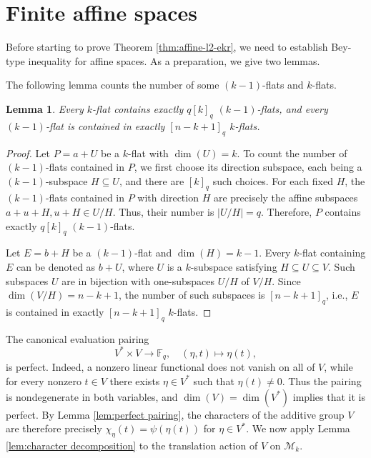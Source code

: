 \documentclass[11pt]{article}
\newtheorem{lemma}{Lemma}
\theoremstyle{definition}
\newcommand{\Fq}{\mathbb F_q}
\begin{document}
\section{Finite affine spaces}


Before starting to prove Theorem \ref{thm:affine-l2-ekr}, we  need to establish Bey-type inequality for affine spaces. As a preparation, we give two lemmas.

The following lemma  counts the number of some $(k-1)$-flats and $k$-flats.

\begin{lemma}\label{lem:affine-counts}
Every $k$-flat contains exactly $q[k]_q$ $(k-1)$-flats, and every $(k-1)$-flat is contained in exactly $[n-k+1]_q$ $k$-flats.
\end{lemma}

\begin{proof}
Let $P=a+U$ be a $k$-flat with $\dim (U)=k$. To count the number of $(k-1)$-flats contained in $P$, we first choose its direction subspace, each being a $(k-1)$-subspace $H\subseteq U$, and there are $[k]_q$ such choices. For each fixed $H$, the $(k-1)$-flats contained in $P$ with direction $H$ are precisely the affine subspaces $a+u+H, u+H\in U/H$. Thus, their number is $|U/H|=q$.  Therefore, $P$ contains exactly $q[k]_q$ $(k-1)$-flats.

Let $E=b+H$ be a $(k-1)$-flat and $\dim (H)=k-1$.  Every $k$-flat containing $E$ can be denoted as $b+U$, where $U$ is a $k$-subspace satisfying $H\subseteq U\subseteq V$. Such subspaces $U$ are in bijection with one-subspaces $U/H$ of $V/H$. Since $\dim(V/H)=n-k+1$, the number of such subspaces is $[n-k+1]_q$, i.e., $E$ is contained in exactly $[n-k+1]_q$ $k$-flats.
\end{proof}

The canonical evaluation pairing
\[
V^* \times V \to \Fq, \quad (\eta, t) \longmapsto \eta(t),
\]
is perfect. Indeed, a nonzero linear functional does not vanish on all of $V$, while for every nonzero $t \in V$ there exists $\eta \in V^*$ such that $\eta(t) \neq 0$. Thus the pairing is nondegenerate in both variables, and $\dim(V)=\dim(V^*)$ implies that it is perfect. By Lemma \ref{lem:perfect pairing}, the characters of the additive group $V$ are therefore precisely $\chi_\eta(t) = \psi(\eta(t))$ for $\eta \in V^*$. We now apply Lemma \ref{lem:character decomposition} to the translation action of $V$ on $\mathcal{M}_k$.
\end{document}
